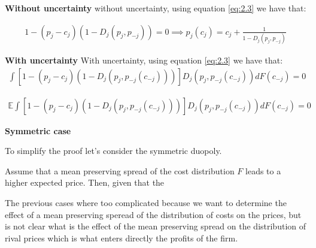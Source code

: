 \documentclass[12pt]{article}
\begin{document}
\textbf{Without uncertainty}
without uncertainty, using equation \ref{eq:2.3} we have that:

\begin{align}\label{eq:2.4}
    1 - (p_j - c_j)  (1 - D_j(p_j, p_{-j})) = 0 \implies p_j(c_j) = c_j + \frac{1}{1 - D_j(p_j, p_{-j})}
\end{align}

\textbf{With uncertainty}
With uncertainty, using equation \ref{eq:2.3} we have that:
\begin{align}\label{eq:2.5}
    \int \left[ 1 - (p_j - c_j)  (1 - D_j(p_j, p_{-j}(c_{-j}))) \right] D_j(p_j, p_{-j}(c_{-j})) dF(c_{-j}) = 0
\end{align}


\begin{align} 
    \mathbb{E}\int \left[ 1 - (p_j - c_j)  (1 - D_j(p_j, p_{-j}(c_{-j}))) \right] D_j(p_j, p_{-j}(c_{-j})) dF(c_{-j}) = 0
\end{align}

\textbf{Symmetric case}

To simplify the proof let's consider the symmetric duopoly.  

Assume that a mean preserving spread of the cost distribution $F$ leads to a higher expected price. 
Then, given that the 

\newpage

The previous cases where too complicated because we want to determine the effect of a mean preserving speread of the distribution of costs on the prices, but is not clear what is the effect of the mean preserving spread on the distribution of rival prices which is what enters directly the profits of the firm. 
\end{document}
